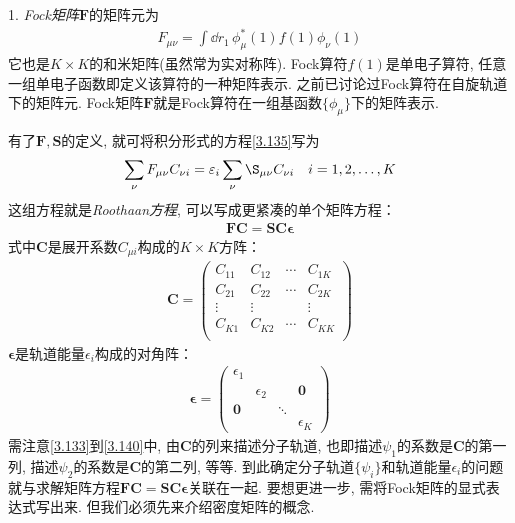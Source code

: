 1. \emph{Fock矩阵$\mathbf{F}$}的矩阵元为
\begin{align}
F_{\mu\nu} = \int\dd{r}_1\,\phi_\mu^*(1)f(1)\phi_\nu(1)
\end{align}
它也是$K\times K$的和米矩阵(虽然常为实对称阵). Fock算符$f(1)$是单电子算符, 任意一组单电子函数即定义该算符的一种矩阵表示. 之前已讨论过Fock算符在自旋轨道下的矩阵元. Fock矩阵$\mathbf{F}$就是Fock算符在一组基函数$\{\phi_\mu\}$下的矩阵表示.

有了$\mathbf{F,S}$的定义, 就可将积分形式的\hft 方程\eqref{3.135}写为
\begin{align}
\sum_\nu F_{\mu\nu} C_{\nu i} = \epsilon_i\sum_{\nu}\S_{\mu\nu}C_{\nu i}\quad i=1,2,\ldots,K
\end{align}
这组方程就是\emph{Roothaan方程}, 可以写成更紧凑的单个矩阵方程：
\begin{align}
\mathbf{FC=SC}\bm{\epsilon}
\end{align}
式中$\mathbf{C}$是展开系数$C_{\mu i}$构成的$K\times K$方阵：
\begin{align}
\label{3.140}
\mathbf{C} =
\begin{pmatrix}
C_{11} & C_{12} & \cdots & C_{1K}\\
C_{21} & C_{22} & \cdots & C_{2K}\\
\vdots & \vdots &        & \vdots\\
C_{K1} & C_{K2} & \cdots & C_{KK}\\
\end{pmatrix}
\end{align} 
$\bm{\epsilon}$是轨道能量$\epsilon_i$构成的对角阵：
\begin{align}
\bm{\epsilon} = 
\begin{pmatrix}
\epsilon_1 & & &\\
           & \epsilon_2 & & \mathbf{0}\\
           \mathbf{0} & & \ddots & \\
           &&&\epsilon_K
\end{pmatrix}
\end{align}
需注意\eqref{3.133}到\eqref{3.140}中, 由$\mathbf{C}$的列来描述分子轨道, 也即描述$\psi_1$的系数是$\mathbf{C}$的第一列, 描述$\psi_2$的系数是$\mathbf{C}$的第二列, 等等.
到此确定\hft 分子轨道$\{\psi_i\}$和轨道能量$\epsilon_i$的问题就与求解矩阵方程$\mathbf{FC=SC}\bm{\epsilon}$关联在一起. 要想更进一步, 需将Fock矩阵的显式表达式写出来. 但我们必须先来介绍密度矩阵的概念.

